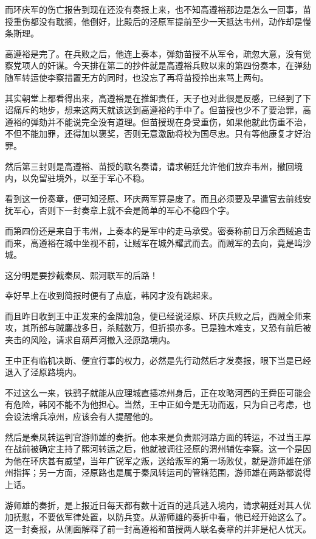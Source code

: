 而环庆军的伤亡报告到现在还没有奏报上来，也不知高遵裕那边是怎么一回事，苗授重伤都没有耽搁，他倒好，比殿后的泾原军提前至少一天抵达韦州，动作却是慢条斯理。

高遵裕是完了。在兵败之后，他连上奏本，弹劾苗授不从军令，疏忽大意，没有觉察党项人的奸谋。今天排在第二的抄件就是高遵裕兵败以来的第四份奏本，在弹劾随军转运使李察措置无方的同时，也没忘了再将苗授拎出来骂上两句。

其实朝堂上都看得出来，高遵裕是在推卸责任，天子也对此很是反感，已经到了下诏痛斥的地步，想来这两天就该送到高遵裕的手中了。但苗授也少不了要治罪，高遵裕的弹劾并不能说完全没有道理。但苗授现在身受重伤，如果他就此伤重不治，不但不能加罪，还得加以褒奖，否则无意激励将校为国尽忠。只有等他康复才好治罪。

然后第三封则是高遵裕、苗授的联名奏请，请求朝廷允许他们放弃韦州，撤回境内，以免留驻境外，以至于军心不稳。

看到这一份奏章，便可知泾原、环庆两军算是废了。而且必须要及早遣官去前线安抚军心，否则下一封奏章上就不会是简单的军心不稳四个字。

而第四份还是来自于韦州，上奏本的是军中的走马承受。密奏称前日万余西贼追击而来，高遵裕在城中坐视不前，让贼军在城外耀武而去。而贼军的去向，竟是鸣沙城。

这分明是要抄截秦凤、熙河联军的后路！

幸好早上在收到简报时便有了点底，韩冈才没有跳起来。

而且昨日收到王中正发来的金牌加急，便已经说泾原、环庆兵败之后，西贼全师来攻，其所部与贼鏖战多日，杀贼数万，但折损亦多。已是独木难支，又恐有前后被夹击的风险，请求自葫芦河撤入泾原路境内。

王中正有临机决断、便宜行事的权力，必然是先行动然后才发奏报，眼下当是已经退入了泾原路境内。

不过这么一来，铁鹞子就能从应理城直插凉州身后，正在攻略河西的王舜臣可能会有危险，韩冈不能不为他担心。当然，王中正如今是无功而返，只为自己考虑，也会设法增兵凉州，应该会有人提醒他的。

然后是秦凤转运判官游师雄的奏折。他本来是负责熙河路方面的转运，不过当王厚在战前被确定主持了熙河转运之后，他就被调往泾原的渭州辅佐李察。这一个是因为他在环庆甚有威望，当年广锐军之叛，送给叛军的第一场败仗，就是游师雄在邠州指挥；另一方面，泾原路也是属于秦凤转运司的管辖范围，游师雄在两路都说得上话。

游师雄的奏折，是上报近日每天都有数十近百的逃兵逃入境内，请求朝廷对其人优加抚慰，不要依军律处置，以防兵变。从游师雄的奏折中看，他已经开始这么了。这一封奏报，从侧面解释了前一封高遵裕和苗授两人联名奏章的并非是杞人忧天。

